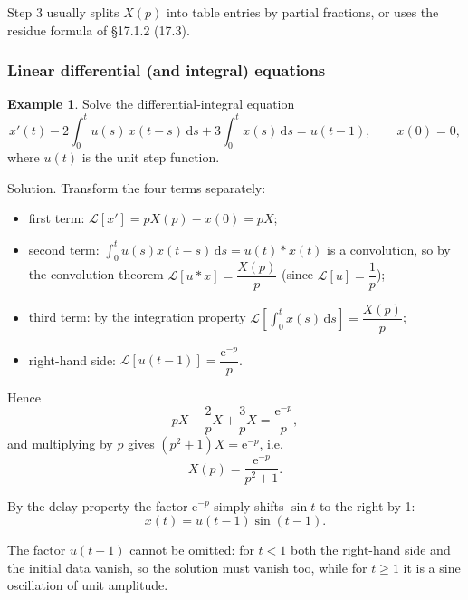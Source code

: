 \documentclass[11pt,a4paper]{article}
\theoremstyle{definition}
\newtheorem{example}{Example}[section]
\theoremstyle{plain}
\begin{document}
Step 3 usually splits $X(p)$ into table entries by partial fractions, or uses the residue formula
of \S 17.1.2 (17.3).

\subsubsection{Linear differential (and integral) equations}

\begin{example}
Solve the differential-integral equation
\begin{equation*}
x'(t)-2\int_{0}^{t}u(s)\,x(t-s)\,\mathrm{d}s+3\int_{0}^{t}x(s)\,\mathrm{d}s=u(t-1),
\qquad x(0)=0 ,
\end{equation*}
where $u(t)$ is the unit step function.
\end{example}

Solution. Transform the four terms separately:
\begin{itemize}\setlength{\itemsep}{2pt}\setlength{\topsep}{3pt}
    \item first term: $\mathcal{L}\left[x'\right]=pX(p)-x(0)=pX$;
    \item second term: $\displaystyle\int_{0}^{t}u(s)x(t-s)\,\mathrm{d}s=u(t)*x(t)$ is a
          convolution, so by the convolution theorem
          $\mathcal{L}\left[u*x\right]=\dfrac{X(p)}{p}$ (since $\mathcal{L}[u]=\dfrac{1}{p}$);
    \item third term: by the integration property
          $\mathcal{L}\left[\displaystyle\int_{0}^{t}x(s)\,\mathrm{d}s\right]=\dfrac{X(p)}{p}$;
    \item right-hand side: $\mathcal{L}\left[u(t-1)\right]=\dfrac{\mathrm{e}^{-p}}{p}$.
\end{itemize}

Hence
\begin{equation*}
pX-\frac{2}{p}X+\frac{3}{p}X=\frac{\mathrm{e}^{-p}}{p},
\end{equation*}
and multiplying by $p$ gives $\left(p^2+1\right)X=\mathrm{e}^{-p}$, i.e.
\begin{equation*}
X(p)=\frac{\mathrm{e}^{-p}}{p^2+1} .
\end{equation*}

By the delay property the factor $\mathrm{e}^{-p}$ simply shifts $\sin t$ to the right by 1:
\begin{equation*}
x(t)=u(t-1)\sin(t-1).
\end{equation*}

The factor $u(t-1)$ cannot be omitted: for $t<1$ both the right-hand side and the initial data
vanish, so the solution must vanish too, while for $t\ge 1$ it is a sine oscillation of unit
amplitude.
\end{document}
